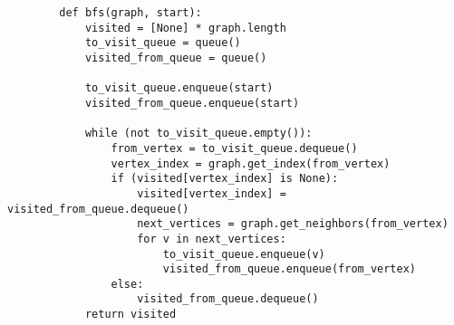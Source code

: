     \begin{lstlisting}
        def bfs(graph, start):
            visited = [None] * graph.length
            to_visit_queue = queue()
            visited_from_queue = queue()
            
            to_visit_queue.enqueue(start)
            visited_from_queue.enqueue(start)
            
            while (not to_visit_queue.empty()):
                from_vertex = to_visit_queue.dequeue()
                vertex_index = graph.get_index(from_vertex)
                if (visited[vertex_index] is None):
                    visited[vertex_index] = visited_from_queue.dequeue()
                    next_vertices = graph.get_neighbors(from_vertex)
                    for v in next_vertices:
                        to_visit_queue.enqueue(v)
                        visited_from_queue.enqueue(from_vertex)
                else:
                    visited_from_queue.dequeue()
            return visited
    \end{lstlisting}




















